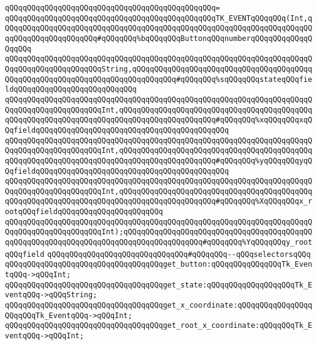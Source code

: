 \verb|qQQqqQQqqQQqqQQqqQQqqQQqqQQqqQQqqQQqqQQqqQQqqQQq=|\newline
\verb|qQQqqQQqqQQqqQQqqQQqqQQqqQQqqQQqqQQqqQQqqQQqqQQqTK_EVENTqQQqqQQq(Int,qQQqqQQqqQQqqQQqqQQqqQQqqQQqqQQqqQQqqQQqqQQqqQQqqQQqqQQqqQQqqQQqqQQqqQQqqQQqqQQqqQQqqQQqqQQq#qQQqqQQq%bqQQqqQQqButtonqQQqnumberqQQqqQQqqQQqqQQqqQQq|\newline
\verb|qQQqqQQqqQQqqQQqqQQqqQQqqQQqqQQqqQQqqQQqqQQqqQQqqQQqqQQqqQQqqQQqqQQqqQQqqQQqqQQqqQQqqQQqqQQqString,qQQqqQQqqQQqqQQqqQQqqQQqqQQqqQQqqQQqqQQqqQQqqQQqqQQqqQQqqQQqqQQqqQQqqQQqqQQqqQQq#qQQqqQQq%sqQQqqQQqstateqQQqfieldqQQqqQQqqQQqqQQqqQQqqQQqqQQq|\newline
\verb|qQQqqQQqqQQqqQQqqQQqqQQqqQQqqQQqqQQqqQQqqQQqqQQqqQQqqQQqqQQqqQQqqQQqqQQqqQQqqQQqqQQqqQQqqQQqInt,qQQqqQQqqQQqqQQqqQQqqQQqqQQqqQQqqQQqqQQqqQQqqQQqqQQqqQQqqQQqqQQqqQQqqQQqqQQqqQQqqQQqqQQqqQQq#qQQqqQQq%xqQQqqQQqxqQQqfieldqQQqqQQqqQQqqQQqqQQqqQQqqQQqqQQqqQQqqQQqqQQq|\newline
\verb|qQQqqQQqqQQqqQQqqQQqqQQqqQQqqQQqqQQqqQQqqQQqqQQqqQQqqQQqqQQqqQQqqQQqqQQqqQQqqQQqqQQqqQQqqQQqInt,qQQqqQQqqQQqqQQqqQQqqQQqqQQqqQQqqQQqqQQqqQQqqQQqqQQqqQQqqQQqqQQqqQQqqQQqqQQqqQQqqQQqqQQqqQQq#qQQqqQQq%yqQQqqQQqyqQQqfieldqQQqqQQqqQQqqQQqqQQqqQQqqQQqqQQqqQQqqQQqqQQq|\newline
\verb|qQQqqQQqqQQqqQQqqQQqqQQqqQQqqQQqqQQqqQQqqQQqqQQqqQQqqQQqqQQqqQQqqQQqqQQqqQQqqQQqqQQqqQQqqQQqInt,qQQqqQQqqQQqqQQqqQQqqQQqqQQqqQQqqQQqqQQqqQQqqQQqqQQqqQQqqQQqqQQqqQQqqQQqqQQqqQQqqQQqqQQqqQQq#qQQqqQQq%XqQQqqQQqx_rootqQQqfieldqQQqqQQqqQQqqQQqqQQqqQQq|\newline
\verb|qQQqqQQqqQQqqQQqqQQqqQQqqQQqqQQqqQQqqQQqqQQqqQQqqQQqqQQqqQQqqQQqqQQqqQQqqQQqqQQqqQQqqQQqqQQqInt);qQQqqQQqqQQqqQQqqQQqqQQqqQQqqQQqqQQqqQQqqQQqqQQqqQQqqQQqqQQqqQQqqQQqqQQqqQQqqQQqqQQqqQQq#qQQqqQQq%YqQQqqQQqy_rootqQQqfield|\newline
\newline
\verb|qQQqqQQqqQQqqQQqqQQqqQQqqQQqqQQq#qQQqqQQq--qQQqselectorsqQQq|\newline
\verb|qQQqqQQqqQQqqQQqqQQqqQQqqQQqqQQqqQQqget_button:qQQqqQQqqQQqqQQqTk_EventqQQq->qQQqInt;|\newline
\verb|qQQqqQQqqQQqqQQqqQQqqQQqqQQqqQQqqQQqget_state:qQQqqQQqqQQqqQQqqQQqTk_EventqQQq->qQQqString;|\newline
\verb|qQQqqQQqqQQqqQQqqQQqqQQqqQQqqQQqqQQqget_x_coordinate:qQQqqQQqqQQqqQQqqQQqqQQqTk_EventqQQq->qQQqInt;|\newline
\verb|qQQqqQQqqQQqqQQqqQQqqQQqqQQqqQQqqQQqget_root_x_coordinate:qQQqqQQqTk_EventqQQq->qQQqInt;|\newline
